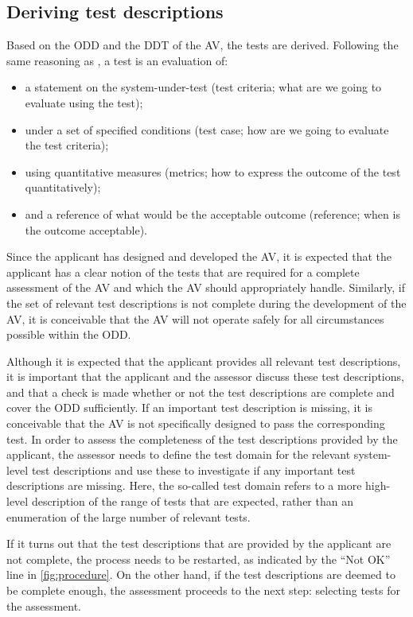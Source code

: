 \documentclass[twoside,twocolumn,9pt]{article}
\theoremstyle{plain}
\theoremstyle{remark}\newtheorem{remarkenv}{Remark}        %
\begin{document}
\subsection{Deriving test descriptions}
\label{sec:test descriptions}

Based on the ODD and the DDT of the AV, the tests are derived. Following the same reasoning as \textcite{stellet2015taxonomy}, a test is an evaluation of:
\begin{itemize}
	\item a statement on the system-under-test (test criteria; what are we going to evaluate using the test);
	\item under a set of specified conditions (test case; how are we going to evaluate the test criteria);
	\item using quantitative measures (metrics; how to express the outcome of the test quantitatively);
	\item and a reference of what would be the acceptable outcome (reference; when is the outcome acceptable).
\end{itemize}

Since the applicant has designed and developed the AV, it is expected that the applicant has a clear notion of the tests that are required for a complete assessment of the AV and which the AV should appropriately handle. Similarly, if the set of relevant test descriptions is not complete during the development of the AV, it is conceivable that the AV will not operate safely for all circumstances possible within the ODD. 

Although it is expected that the applicant provides all relevant test descriptions, it is important that the applicant and the assessor discuss these test descriptions, and that a check is made whether or not the test descriptions are complete and cover the ODD sufficiently. If an important test description is missing, it is conceivable that the AV is not specifically designed to pass the corresponding test. In order to assess the completeness of the test descriptions provided by the applicant, the assessor needs to define the test domain for the relevant system-level test descriptions and use these to investigate if any important test descriptions are missing. Here, the so-called test domain refers to a more high-level description of the range of tests that are expected, rather than an enumeration of the large number of relevant tests.

If it turns out that the test descriptions that are provided by the applicant are not complete, the process needs to be restarted, as indicated by the ``Not OK'' line in \cref{fig:procedure}. On the other hand, if the test descriptions are deemed to be complete enough, the assessment proceeds to the next step: selecting tests for the assessment.
\end{document}
